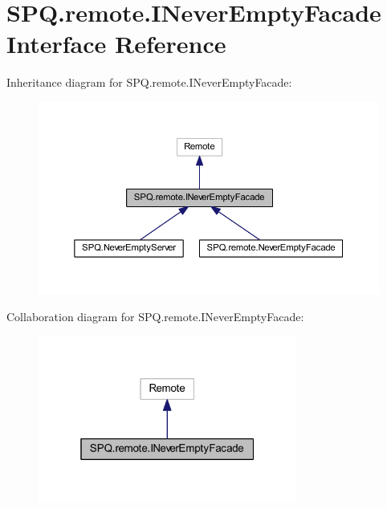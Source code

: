 \hypertarget{interface_s_p_q_1_1remote_1_1_i_never_empty_facade}{}\section{S\+P\+Q.\+remote.\+I\+Never\+Empty\+Facade Interface Reference}
\label{interface_s_p_q_1_1remote_1_1_i_never_empty_facade}


Inheritance diagram for S\+P\+Q.\+remote.\+I\+Never\+Empty\+Facade\+:\nopagebreak
\begin{figure}[H]
\begin{center}
\leavevmode
\includegraphics[width=350pt]{interface_s_p_q_1_1remote_1_1_i_never_empty_facade__inherit__graph}
\end{center}
\end{figure}


Collaboration diagram for S\+P\+Q.\+remote.\+I\+Never\+Empty\+Facade\+:\nopagebreak
\begin{figure}[H]
\begin{center}
\leavevmode
\includegraphics[width=241pt]{interface_s_p_q_1_1remote_1_1_i_never_empty_facade__coll__graph}
\end{center}
\end{figure}
